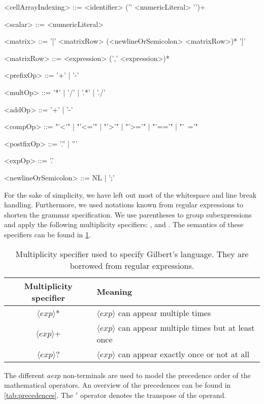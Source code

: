 \begin{grammar}
<cellArrayIndexing> ::= <identifier> ('{' <numericLiteral> '}')+

<scalar> ::= <numericLiteral>

<matrix> ::= '[' <matrixRow> (<newlineOrSemicolon> <matrixRow>)* ']'

<matrixRow> ::= <expression> (',' <expression>)*

<prefixOp> ::= '+' | '-'

<multOp> ::= '*' | '/' | '.*' | './'

<addOp> ::= '+' | '-'

<compOp> ::= "'<'" | "'<='" | "'>'" | "'>='" | "'=='" | "'~='"

<postfixOp> ::= '.'' | '''

<expOp> ::= '.'

<newlineOrSemicolon> ::= NL | ';'

\end{grammar}

For the sake of simplicity, we have left out most of the whitespace and line break handling.
Furthermore, we used notations known from regular expressions to shorten the grammar specification.
We use parentheses to group subexpressions and apply the following multiplicity specifiers: \code{*}, \code{+} and .
The semantics of these specifiers can be found in \cref{tab:multiplicity}.

\begin{table}
	\centering
	\begin{tabular}{c|l}
	Multiplicity specifier & Meaning\\
	\hline
	$\langle exp \rangle$* & $\langle exp\rangle$ can appear multiple times \\
	$\langle exp\rangle$+ & $\langle exp\rangle$ can appear multiple times but at least once \\
	$\langle exp\rangle$? & $\langle exp\rangle$ can appear exactly once or not at all
	\end{tabular}
	\caption{Multiplicity specifier used to specify Gilbert's language. They are borrowed from regular expressions.}
	\label{tab:multiplicity}
\end{table}

The different \emph{aexp} non-terminals are used to model the precedence order of the mathematical operators.
An overview of the precedences can be found in \cref{tab:precedences}.
The $'$ operator denotes the transpose of the operand.

